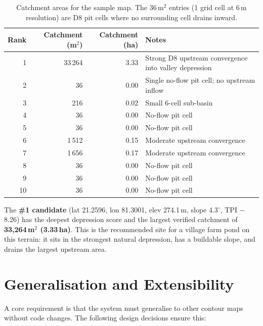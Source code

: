 \documentclass[12pt,a4paper]{article}
\begin{document}
\begin{table}[H]
\centering
\small
\begin{tabular}{@{}rrrl@{}}
\toprule
\textbf{Rank} & \textbf{Catchment (m$^2$)} & \textbf{Catchment (ha)} & \textbf{Notes} \\
\midrule
1  & 33\,264 & 3.33 & Strong D8 upstream convergence into valley depression \\
2  & 36      & 0.00 & Single no-flow pit cell; no upstream inflow \\
3  & 216     & 0.02 & Small 6-cell sub-basin \\
4  & 36      & 0.00 & No-flow pit cell \\
5  & 36      & 0.00 & No-flow pit cell \\
6  & 1\,512  & 0.15 & Moderate upstream convergence \\
7  & 1\,656  & 0.17 & Moderate upstream convergence \\
8  & 36      & 0.00 & No-flow pit cell \\
9  & 36      & 0.00 & No-flow pit cell \\
10 & 36      & 0.00 & No-flow pit cell \\
\bottomrule
\end{tabular}
\caption{Catchment areas for the sample map. The 36\,m$^2$ entries (1 grid cell at 6\,m resolution) are D8 pit cells where no surrounding cell drains inward.}
\label{tab:catchment}
\end{table}

The \textbf{\#1 candidate} (lat 21.2596, lon 81.3001, elev 274.1\,m, slope 4.3$^\circ$, TPI $-$8.26) has the deepest depression score and the largest verified catchment of \textbf{33,264\,m$^2$ (3.33\,ha)}. This is the recommended site for a village farm pond on this terrain: it sits in the strongest natural depression, has a buildable slope, and drains the largest upstream area.

\section{Generalisation and Extensibility}

A core requirement is that the system must generalise to other contour maps without code changes. The following design decisions ensure this:
\end{document}
